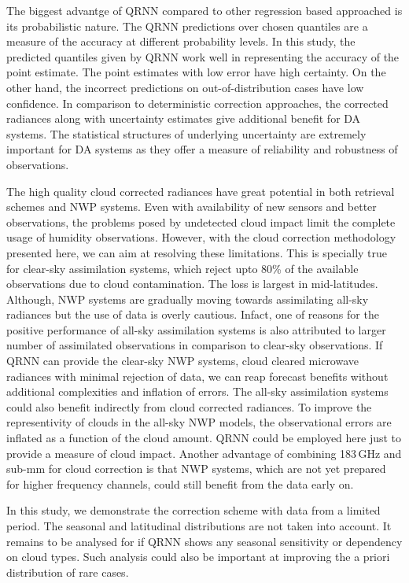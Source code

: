 \documentclass[amt, manuscript]{copernicus}
\begin{document}
The biggest advantge of QRNN compared to other regression based approached is its probabilistic nature. The QRNN predictions over chosen quantiles are a measure of the accuracy at different probability levels. In this study, the predicted quantiles given by QRNN work well in representing the accuracy of the point estimate. The point estimates with low error have high certainty. On the other hand, the  incorrect predictions on out-of-distribution cases have low confidence. In comparison to deterministic correction approaches, the corrected radiances along with uncertainty estimates give additional benefit for DA systems. The statistical structures of underlying uncertainty are extremely important for DA systems as they offer a measure of reliability and robustness of observations.

The high quality cloud corrected radiances have great potential in both retrieval schemes and  NWP systems. Even with availability of new sensors and better observations, the problems posed by undetected cloud impact limit the complete usage of humidity observations. However, with the cloud correction methodology presented here, we can aim at resolving these limitations. This is specially true for clear-sky assimilation systems, which reject upto 80\% of the available observations due to cloud contamination. The loss is largest in mid-latitudes. Although, NWP systems are gradually moving towards assimilating all-sky radiances but the use of data is overly cautious. Infact, one of reasons for the positive performance of all-sky assimilation systems is also attributed to larger number of assimilated observations in comparison to clear-sky observations. If QRNN can provide the clear-sky NWP systems, cloud cleared microwave radiances with minimal rejection of data, we can reap forecast benefits without  additional complexities and inflation of errors. The all-sky assimilation systems could also benefit indirectly from cloud corrected radiances. To improve the representivity of clouds in the all-sky NWP models, the observational errors are inflated as a function of the cloud amount. QRNN could be employed here just to provide a measure of cloud impact. Another advantage of combining 183\,GHz and sub-mm for cloud correction is that NWP systems, which are not yet prepared for higher frequency channels, could still benefit from the data early on. 

In this study, we demonstrate the correction scheme with data from a limited period. The seasonal and latitudinal distributions are not taken into account. It remains to be  analysed for if QRNN shows any seasonal sensitivity or dependency on cloud types. Such analysis could also be important at improving the a priori distribution of rare cases. 
\end{document}
